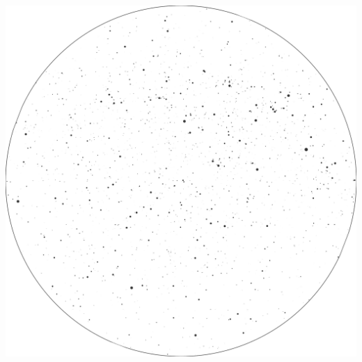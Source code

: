 \documentclass{./SAS-class-skygen}
\begin{document}
	\vspace{0.5cm}
    \begin{center}
    \includegraphics[width=\textwidth]{./pics/skychart24.png}
    \end{center}
    
    
\end{document}
